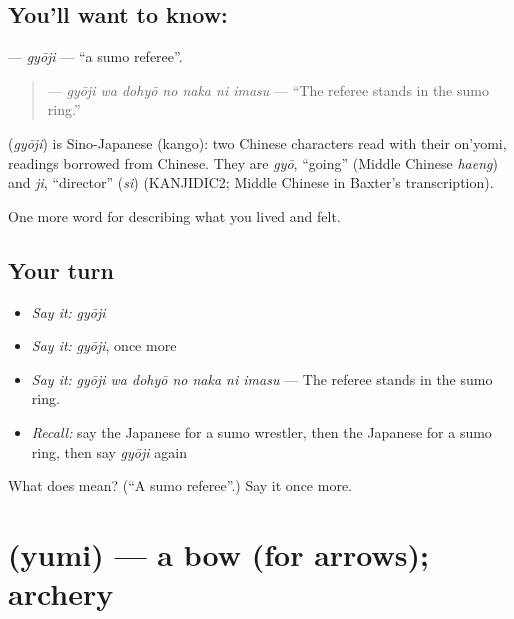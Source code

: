 \subsection*{You'll want to know: }
\textbf{} — \emph{gyōji} — \textquotedblleft{}a sumo referee\textquotedblright{}.

\begin{quote}
\textbf{   } — \emph{gyōji wa dohyō no naka ni imasu} — \textquotedblleft{}The referee stands in the sumo ring.\textquotedblright{}
\end{quote}

\begin{cousinweb}
\textbf{} (\emph{gyōji}) is Sino-Japanese (kango): two Chinese characters read with their on'yomi, readings borrowed from Chinese. They are \emph{gyō}, \textquotedblleft{}going\textquotedblright{} (Middle Chinese \emph{haeng}) and \emph{ji}, \textquotedblleft{}director\textquotedblright{} (\emph{si}) (KANJIDIC2; Middle Chinese in Baxter's transcription).
\end{cousinweb}

\begin{grammarlens}[title={What you've built}]
One more word for describing what you lived and felt.
\end{grammarlens}

\subsection*{Your turn}
\begin{itemize}
\raggedright
  \item \emph{Say it:} \emph{gyōji}
  \item \emph{Say it:} \emph{gyōji}, once more
  \item \emph{Say it:} \emph{gyōji wa dohyō no naka ni imasu} — The referee stands in the sumo ring.
  \item \emph{Recall:} say the Japanese for a sumo wrestler, then the Japanese for a sumo ring, then say \emph{gyōji} again
\end{itemize}

\begin{tcolorbox}[breakable,colback=teal!4,colframe=teal!35!black,title={Before you move on}]
What does  mean? (\textquotedblleft{}A sumo referee\textquotedblright{}.) Say it once more.
\end{tcolorbox}
\section[\texorpdfstring{\ja{ゆみ} (yumi)}{ゆみ (yumi)}]{ (yumi) — a bow (for arrows); archery}

